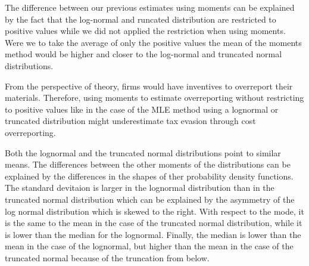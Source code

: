 \documentclass[
  12pt]{article}
\theoremstyle{definition}
\theoremstyle{remark}
\begin{document}
The difference between our previous estimates using moments can be
explained by the fact that the log-normal and runcated distribution are
restricted to positive values while we did not applied the restriction
when using moments. Were we to take the average of only the positive
values the mean of the moments method would be higher and closer to the
log-normal and truncated normal distributions.

From the perspective of theory, firms would have inventives to
overreport their materials. Therefore, using moments to estimate
overreporting without restricting to positive values like in the case of
the MLE method using a lognormal or truncated distribution might
underestimate tax evasion through cost overreporting.

Both the lognormal and the truncated normal distributions point to
similar means. The differences between the other moments of the
distributions can be explained by the differences in the shapes of ther
probability density functions. The standard devitaion is larger in the
lognormal distribution than in the truncated normal distribution which
can be explained by the asymmetry of the log normal distribution which
is skewed to the right. With respect to the mode, it is the same to the
mean in the case of the truncated normal distribution, while it is lower
than the median for the lognormal. Finally, the median is lower than the
mean in the case of the lognormal, but higher than the mean in the case
of the truncated normal because of the truncation from below.
\end{document}
